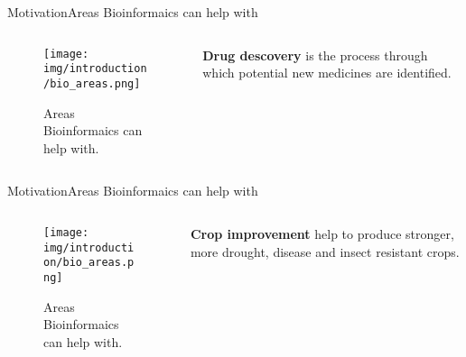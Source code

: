 \documentclass[10pt]{beamer}
\newcommand{\1}{
        	\setbeamertemplate{background}{
        		\texttt{[image: img/1]}
        		\tikz[overlay] \fill[fill opacity=0.75,fill=white] (0,0) rectangle (-\paperwidth,\paperheight);
        	}
}
\begin{document}
\begin{frame}{Motivation}{Areas Bioinformaics can help with}
	\begin{columns}
		\begin{column}{0.68\textwidth}
			
			\begin{figure}[]
				\centering
				\texttt{[image: img/introduction/bio\_areas.png]}
				\label{img:mot2}
				\caption{Areas Bioinformaics can help with.}
			\end{figure}
		\end{column}
		\begin{column}{0.28\textwidth}
			\textbf{Drug descovery} is the process through which potential new medicines are identified.
		\end{column}
	\end{columns}
\end{frame}

\begin{frame}{Motivation}{Areas Bioinformaics can help with}
	\begin{columns}
		\begin{column}{0.68\textwidth}
			
			\begin{figure}[]
				\centering
				\texttt{[image: img/introduction/bio\_areas.png]}
				\label{img:mot2}
				\caption{Areas Bioinformaics can help with.}
			\end{figure}
		\end{column}
		\begin{column}{0.28\textwidth}
			\textbf{Crop improvement} help to produce stronger, more drought, disease and insect resistant crops.
		\end{column}
	\end{columns}
\end{frame}
\end{document}
